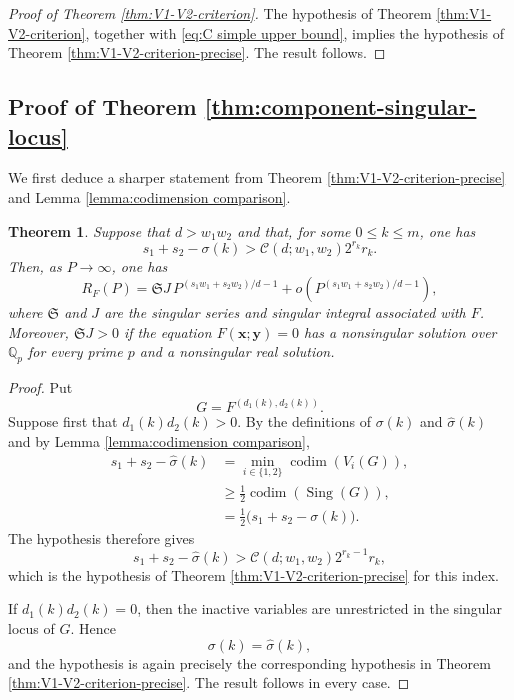 \documentclass[12pt,reqno]{amsart}
\newtheorem{theorem}{Theorem}[section]
\theoremstyle{definition}
\theoremstyle{remark}
\numberwithin{equation}{section}
\newcommand{\codim}[1]{\operatorname{codim}\left(#1\right)}
\newcommand{\Sing}[1]{\operatorname{Sing}\left(#1\right)}
\def\bfx{{\mathbf x}}
\def\bfy{{\mathbf y}}
\begin{document}
\begin{proof}[Proof of Theorem \ref{thm:V1-V2-criterion}]
The hypothesis of Theorem \ref{thm:V1-V2-criterion}, together with
\eqref{eq:C simple upper bound}, implies the hypothesis of Theorem
\ref{thm:V1-V2-criterion-precise}. The result follows.
\end{proof}

\subsection{Proof of Theorem \ref{thm:component-singular-locus}}

We first deduce a sharper statement from Theorem
\ref{thm:V1-V2-criterion-precise} and Lemma
\ref{lemma:codimension comparison}.

\begin{theorem}\label{thm:component-singular-locus-precise}
Suppose that $d>w_1w_2$ and that, for some $0\leq k\leq m$, one has
\[
    s_1+s_2-\sigma(k)
    >
    \mathcal C(d;w_1,w_2)2^{r_k}r_k.
\]
Then, as $P\to\infty$, one has
\[
    R_F(P)
    =\mathfrak S J\,
    P^{(s_1w_1+s_2w_2)/d-1}
    +o\left(P^{(s_1w_1+s_2w_2)/d-1}\right),
\]
where $\mathfrak S$ and $J$ are the singular series and singular integral
associated with $F$. Moreover, $\mathfrak S J>0$ if the equation
$F(\bfx;\bfy)=0$ has a nonsingular solution over $\mathbb Q_p$ for every
prime $p$ and a nonsingular real solution.
\end{theorem}

\begin{proof}
Put
\[
    G=F^{(d_1(k),d_2(k))}.
\]
Suppose first that $d_1(k)d_2(k)>0$. By the definitions of
$\sigma(k)$ and $\widehat\sigma(k)$ and by Lemma
\ref{lemma:codimension comparison},
\[
\begin{aligned}
    s_1+s_2-\widehat\sigma(k)
    &=\min_{i\in\{1,2\}}\codim{V_i(G)},\\
    &\geq\frac12\codim{\Sing{G}},\\
    &=\frac12\bigl(s_1+s_2-\sigma(k)\bigr).
\end{aligned}
\]
The hypothesis therefore gives
\[
    s_1+s_2-\widehat\sigma(k)
    >\mathcal C(d;w_1,w_2)2^{r_k-1}r_k,
\]
which is the hypothesis of Theorem
\ref{thm:V1-V2-criterion-precise} for this index.

If $d_1(k)d_2(k)=0$, then the inactive variables are unrestricted in the
singular locus of $G$. Hence
\[
    \sigma(k)=\widehat\sigma(k),
\]
and the hypothesis is again precisely the corresponding hypothesis in
Theorem \ref{thm:V1-V2-criterion-precise}. The result follows in every
case.
\end{proof}
\end{document}
